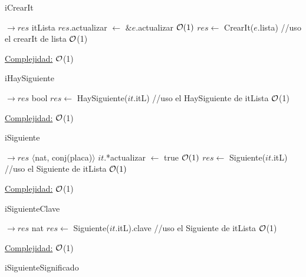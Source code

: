 \begin{Algoritmos}
	
	\begin{algorithm}[H]
		\caption{iCrearIt}
		\begin{algorithmic}[1]
			 $\to res$ itLista
			\State $res$.actualizar $\gets$ $\&e$.actualizar \Comment $\mathcal{O}(1)$
			\State $res \leftarrow$ CrearIt($e$.lista) //uso el crearIt de lista \Comment $\mathcal{O}$(1)
			\EndProcedure 
		\end{algorithmic}
		\underline{Complejidad:} $\mathcal{O}$(1)
	\end{algorithm}
	
	\begin{algorithm}[H]
		\caption{iHaySiguiente}
		
		\begin{algorithmic}[1]
			 $\to res$ bool
			\State $res \leftarrow$ HaySiguiente($it$.itL) //uso el HaySiguiente de itLista \Comment $\mathcal{O}$(1)
			\EndProcedure 
		\end{algorithmic}
		\underline{Complejidad:} $\mathcal{O}$(1)
	\end{algorithm}
	
	\begin{algorithm}[H]
		\caption{iSiguiente}
		
		\begin{algorithmic}[1]
			 $\to res$ $\langle$nat, conj(placa)$\rangle$
			\State $it$.*actualizar $\gets$ true \Comment $\mathcal{O}(1)$
			\State $res \leftarrow$ Siguiente($it$.itL) //uso el Siguiente de itLista \Comment $\mathcal{O}(1)$
			\EndProcedure 
		\end{algorithmic}
		\underline{Complejidad:} $\mathcal{O}$(1)
	\end{algorithm}
	
	\begin{algorithm}[H]
		\caption{iSiguienteClave}
		
		\begin{algorithmic}[1]
			 $\to res$ nat
			\State $res \leftarrow$ Siguiente($it$.itL).clave //uso el Siguiente de itLista \Comment $\mathcal{O}$(1)
			\EndProcedure 
		\end{algorithmic}
		\underline{Complejidad:} $\mathcal{O}$(1)
	\end{algorithm}
	
	\begin{algorithm}[H]
		\caption{iSiguienteSignificado}
		

\end{algorithm}
\end{Algoritmos}
